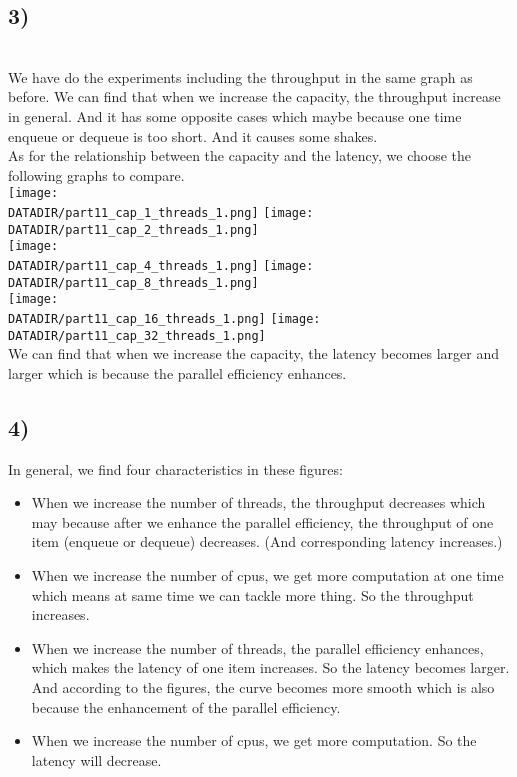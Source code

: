 \documentclass{article}
\newcommand{\DATADIR}{} %
\begin{document}
\begin{spacing}{1.1}
\subsection*{3)}
\\We have do the experiments including the throughput in the same graph as before. We can find that when we increase the capacity, the throughput increase in general. And it has some opposite cases which maybe because one time enqueue or dequeue is too short. And it causes some shakes. 
\\\indent As for the relationship between the capacity and the latency, we choose the following graphs to compare.
\\\texttt{[image: \\DATADIR/part11\_cap\_1\_threads\_1.png]}
\texttt{[image: \\DATADIR/part11\_cap\_2\_threads\_1.png]}
\newpage
\\\texttt{[image: \\DATADIR/part11\_cap\_4\_threads\_1.png]}
\texttt{[image: \\DATADIR/part11\_cap\_8\_threads\_1.png]}
\\\texttt{[image: \\DATADIR/part11\_cap\_16\_threads\_1.png]}
\texttt{[image: \\DATADIR/part11\_cap\_32\_threads\_1.png]}
\\\indent We can find that when we increase the capacity, the latency becomes larger and larger which is because the parallel efficiency enhances.

\subsection*{4)}
\indent In general, we find four characteristics in these figures:
\begin{itemize}
    \item When we increase the number of threads, the throughput decreases which may because after we enhance the parallel efficiency, the throughput of one item (enqueue or dequeue) decreases. (And corresponding latency increases.)
    \item When we increase the number of cpus, we get more computation at one time which means at same time we can tackle more thing. So the throughput increases.
    \item When we increase the number of threads, the parallel efficiency enhances, which makes the latency of one item increases. So the latency becomes larger. And according to the figures, the curve becomes more smooth which is also because the enhancement of the parallel efficiency.
    \item When we increase the number of cpus, we get more computation. So the latency will decrease.
\end{itemize}


\end{spacing}
\end{document}
